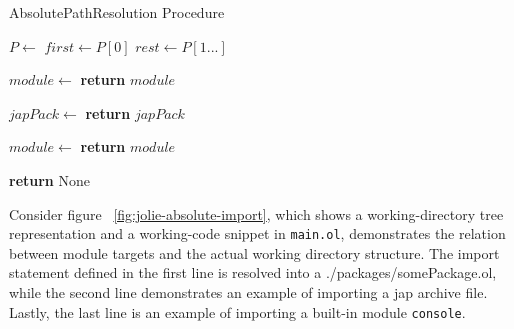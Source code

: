 \begin{algorithm}[h]
    \caption{AbsolutePathResolution Procedure}
    \label{algo:absolutePath}
    \begin{algorithmic}[1]


        \State $P\gets$  
        \State $first\gets P[0]$ 
        \State $rest\gets P[1...]$ 

        \State $module \gets$
        \State \textbf{return} $module$ 
        \EndIf

        \State $japPack \gets$
        \State \textbf{return} $japPack$
        \EndIf
        \EndIf

        \State $module \gets$
        \State \textbf{return} $module$ 
        \EndIf
        \EndFor

        \State \textbf{return} None 

        \EndProcedure

    \end{algorithmic}
\end{algorithm}

Consider figure ~\ref{fig:jolie-absolute-import}, which shows a working-directory tree representation and a working-code snippet in \texttt{main.ol}, demonstrates the relation between module targets and the actual working directory structure. The import statement defined in the first line is resolved into a ./packages/somePackage.ol, while the second line demonstrates an example of importing a jap archive file. Lastly, the last line is an example of importing a built-in module \texttt{console}.

